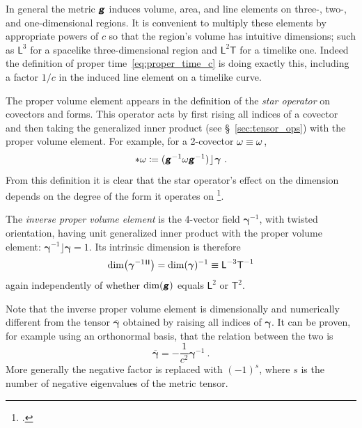 \documentclass[\ifafour a4paper,12pt,\else a5paper,10pt,\fi%
onecolumn,oneside,article,%
british%
]{memoir}
\makeatletter
\theoremstyle{remark}
\theoremstyle{innote}
\newcommand*{\mathte}[1]{\textbf{\textit{\textsf{#1}}}}
\newcommand*{\citep}{\footcites}
\newcommand*{\defd}{\coloneqq}
\DeclarePairedDelimiter\abs{\lvert}{\rvert}
\renewcommand*{\|}[1][]{\nonscript\,#1\vert\nonscript\;\mathopen{}}
\newcommand*{\sect}{\S}%
\newcommand*{\sects}{\S\S}%
\newcommand*{\chap}{ch.}%
\newcommand*{\cf}{{cf.}}
\newcommand*{\q}{}%
\DeclareRobustCommand*{\q}{%
  \mathbin{\mathpalette\bigcdot@{}}%
}
\newcommand*{\bigcdot@scalefactor}{0.7}
\newcommand*{\bigcdot@widthfactor}{1.5}
\newcommand*{\bigcdot@}[2]{%
  \sbox0{$#1\vcenter{}$}%
  \sbox2{$#1\cdot\m@th$}%
  \hbox to \bigcdot@widthfactor\wd2{%
    \hfil
    \raise\ht0\hbox{%
      \scalebox{\bigcdot@scalefactor}{%
        \lower\ht0\hbox{$#1\bullet\m@th$}%
      }%
    }%
    \hfil
  }%
}
\newcommand*{\Le}{\textsf{L}}
\newcommand*{\Ti}{\textsf{T}}
\newcommand*{\Li}{\textsf{L}}
\newcommand*{\ii}{\mathbin{\!\rfloor\!}}
\newcommand*{\yg}{\mathte{g}}
\renewcommand*{\i}{\indices}
\newcommand*{\ygv}{\bm{\gamma}}
\newcommand*{\ygu}{\overline{\ygv}}
\newcommand*{\rul}{{\mkern2mu\rule[-0.1ex]{0.75pt}{1.1ex}\mkern2mu}}
\DeclarePairedDelimiter\mul{\rul}{\rul}%
\makeatother
\begin{document}
In general the metric $\yg$ induces volume, area, and line elements on
three-, two-, and one-dimensional regions. It is convenient to multiply
these elements by appropriate powers of $c$ so that the region's volume has
intuitive dimensions; such as $\Li^{3}$ for a spacelike three-dimensional
region and $\Li^{2}\Ti$ for a timelike one. Indeed the definition of proper
time~\eqref{eq:proper_time_c} is doing exactly this, including a factor
$1/c$ in the induced line element on a timelike curve.

The proper volume element appears in the definition of the \emph{star
  operator} on covectors and forms. This operator acts by first rising all
indices of a covector and then taking the generalized inner product (see
\sect~\ref{sec:tensor_ops}) with the proper volume element. For example,
for a 2-covector $\omega \equiv \omega\i{_{\q\q}}$,
\begin{equation}
  \label{eq:star_op}
  *\omega \defd (\yg^{-1}\omega\yg^{-1})\ii\ygv \ .
\end{equation}
From this definition it is clear that the star operator's effect on the
dimension depends on the degree of the form it operates on \citep[I
personally prefer to avoid the star operator and explicitly use the inner
product with the proper volume element; \cf][\sects~4.1--2]{bossavit1991}.

The \emph{inverse proper volume element} is the 4-vector field $\ygv^{-1}$,
with twisted orientation, having unit generalized inner product with the
proper volume element: $\ygv^{-1} \ii \ygv = 1$. Its intrinsic dimension is
therefore
\begin{equation}
  \label{eq:dim_inv_volume_elem}
  \dim\bigl(\ygv^{-1}{}\i{^{\mul{\q\q\q\q}}}\bigr) =
  \dim(\ygv)^{-1} \equiv \Le^{-3}\Ti^{-1}
\end{equation}
again independently of whether $\dim(\yg)$ equals $\Li^{2}$ or $\Ti^{2}$.

Note that the inverse proper volume element is dimensionally and
numerically different from the tensor $\ygu$ obtained by raising all
indices of $\ygv$. It can be proven, for example using an orthonormal
basis, that the relation between the two is
\begin{equation}
  \label{eq:relation_volumes}
  \ygu = -\frac{1}{c^{2}} \ygv^{-1} \ .
\end{equation}
More generally the negative factor is replaced with $(-1)^{s}$, where $s$ is
the number of negative eigenvalues of the metric tensor.


\end{document}

